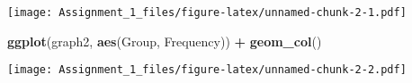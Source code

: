 \documentclass[]{article}
\newenvironment{Shaded}{\begin{snugshade}}{\end{snugshade}}
\newcommand{\KeywordTok}[1]{\textcolor[rgb]{0.13,0.29,0.53}{\textbf{#1}}}
\newcommand{\StringTok}[1]{\textcolor[rgb]{0.31,0.60,0.02}{#1}}
\newcommand{\OperatorTok}[1]{\textcolor[rgb]{0.81,0.36,0.00}{\textbf{#1}}}
\newcommand{\NormalTok}[1]{#1}
\begin{document}
\texttt{[image: Assignment\_1\_files/figure-latex/unnamed-chunk-2-1.pdf]}

\begin{Shaded}
\begin{Highlighting}[]
\KeywordTok{ggplot}\NormalTok{(graph2, }\KeywordTok{aes}\NormalTok{(Group, Frequency)) }\OperatorTok{+}
\StringTok{  }\KeywordTok{geom_col}\NormalTok{()}
\end{Highlighting}
\end{Shaded}

\texttt{[image: Assignment\_1\_files/figure-latex/unnamed-chunk-2-2.pdf]}
\end{document}
